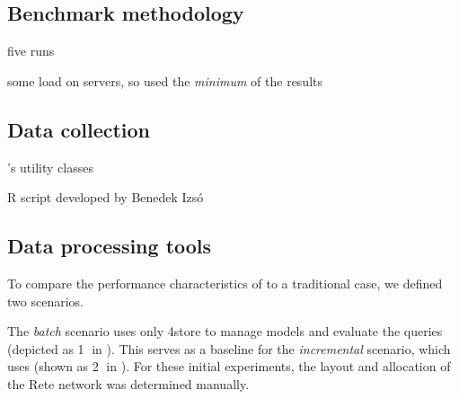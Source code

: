 \subsection{Benchmark methodology}

five runs

some load on servers, so used the \emph{minimum} of the results

\subsection{Data collection}

\tb{}'s utility classes

R script \cite{RProject} developed by Benedek Izsó 

\subsection{Data processing tools}

To compare the performance characteristics of \iqd{} to a traditional case, we defined two scenarios. 

The \textit{batch} scenario uses only 4store to manage models and evaluate the queries (depicted as \textcircled{1} in ). This serves as a baseline for the \textit{incremental} scenario, which uses \iqd{} (shown as \textcircled{2} in ). For these initial experiments, the layout and allocation of the Rete network was determined manually. 
